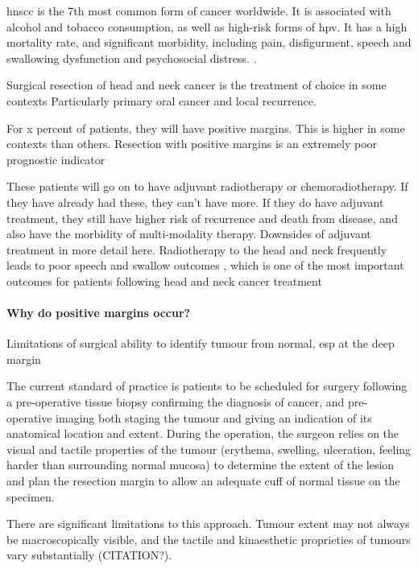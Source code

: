 
\Gls{hnscc} is the 7th most common form of cancer worldwide. 
It is associated with alcohol and tobacco consumption, as well as high-risk forms of \gls{hpv}.
It has a high mortality rate, and significant morbidity, including pain, disfigurment, speech and swallowing dysfunction and psychosocial distress. \cite{chowHeadNeckCancer2020}.



Surgical resection of head and neck cancer is the treatment of choice in some contexts
Particularly primary oral cancer and local recurrence.

For x percent of patients, they will have positive margins. 
This is higher in some contexts than others.
Resection with positive margins is an extremely poor prognostic indicator

These patients will go on to have adjuvant radiotherapy or chemoradiotherapy.
If they have already had these, they can't have more.
If they do have adjuvant treatment, they still have higher risk of recurrence and death from disease, and also have the morbidity of multi-modality therapy.
Downsides of adjuvant treatment in more detail here.
Radiotherapy to the head and neck frequently leads to poor speech and swallow outcomes \cite{machtayFactorsAssociatedSevere2008, wangPharyngoesophagealStrictureTreatment2012}, which is one of the most important outcomes for patients following head and neck cancer treatment \cite{wilsonDysphagiaNonsurgicalHead2011} 

\paragraph{Why do positive margins occur?}
Limitations of surgical ability to identify tumour from normal, esp at the deep margin

The current standard of practice is patients to be scheduled for surgery following a pre-operative tissue biopsy confirming the diagnosis of cancer, and pre-operative imaging both staging the tumour and giving an indication of its anatomical location and extent.
During the operation, the surgeon relies on the visual and tactile properties of the tumour (erythema, swelling, ulceration, feeling harder than surrounding normal mucosa) to determine the extent of the lesion and plan the resection margin to allow an adequate cuff of normal tissue on the specimen.

There are significant limitations to this approach. 
Tumour extent may not always be macroscopically visible, and the tactile and kinaesthetic proprieties of tumours vary substantially (CITATION?).

